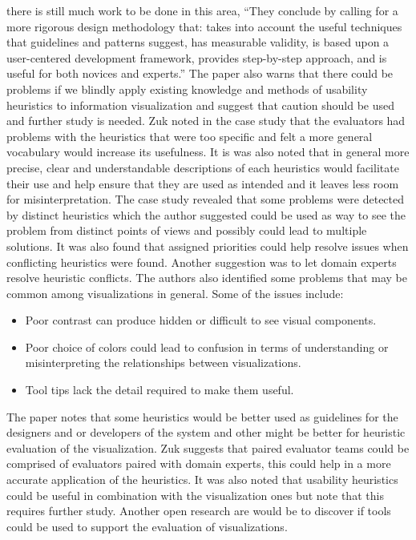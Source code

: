 \documentclass{sig-alternate}
\begin{document}
there is still much work to be done in this area, ``They conclude by calling for
a more rigorous design methodology that: takes into account the useful
techniques that guidelines and patterns suggest, has measurable validity, is
based upon a user-centered development framework, provides step-by-step
approach, and is useful for both novices and
experts.''\cite{Zuk:2006:HeuristicsForInformationVisualizationEvaluation} The
paper also warns that there could be problems if we blindly apply existing
knowledge and methods of usability heuristics to information visualization and
suggest that caution should be used and further study is needed. Zuk noted in
the case study that the evaluators had problems with the heuristics that were
too specific and felt a more general vocabulary would increase its usefulness.
It is was also noted that in general more precise, clear and understandable
descriptions of each heuristics would facilitate their use and help ensure that
they are used as intended and it leaves less room for misinterpretation. The
case study revealed that some problems were detected by distinct heuristics
which the author suggested could be used as way to see the problem from distinct
points of views and possibly could lead to multiple solutions.  It was also
found that assigned priorities could help resolve issues when conflicting
heuristics were found. Another suggestion was to let domain experts resolve
heuristic conflicts. The authors also identified some problems that may be
common among visualizations in general. Some of the issues include:
\begin{itemize} \item Poor contrast can produce hidden or difficult to see
visual components. \item Poor choice of colors could lead to confusion in terms
of understanding or misinterpreting the relationships between visualizations.
\item Tool tips lack the detail required to make them useful.
\end{itemize}

The paper notes that some heuristics would be better used as guidelines for the
designers and or developers of the system and other might be better for
heuristic evaluation of the visualization. Zuk suggests that paired evaluator
teams could be comprised of evaluators paired with domain experts, this could
help in a more accurate application of the heuristics. It was also noted that
usability heuristics could be useful in combination with the visualization
ones but note that this requires further study. Another open research are would
be to discover if tools could be used to support the evaluation of
visualizations.
\end{document}
